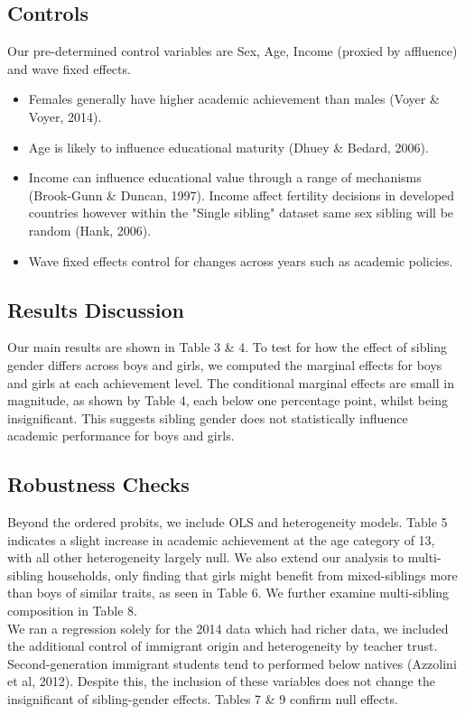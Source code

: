 \documentclass[12pt]{article}
\begin{document}
\subsection{Controls}
Our pre-determined control variables are Sex, Age, Income (proxied by affluence) and wave fixed effects. 
\begin{itemize}
    \item Females generally have higher academic achievement than males (Voyer \& Voyer, 2014). 
    \item Age is likely to influence educational maturity (Dhuey \& Bedard, 2006). 
    \item Income can influence educational value through a range of mechanisms (Brook-Gunn \& Duncan, 1997). Income affect fertility decisions in developed countries however within the "Single sibling" dataset same sex sibling will be random (Hank, 2006).
    \item Wave fixed effects control for changes across years such as academic policies.
\end{itemize}


\subsection{Results Discussion}

Our main results are shown in Table 3 \& 4. To test for how the effect of sibling gender differs across boys and girls, we computed the marginal effects for boys and girls at each achievement level. The conditional marginal effects are small in magnitude, as shown by Table 4, each below one percentage point, whilst being insignificant. This suggests sibling gender does not statistically influence academic performance for boys and girls.

\subsection{Robustness Checks}

Beyond the ordered probits, we include OLS and heterogeneity models. Table 5 indicates a slight increase in academic achievement at the age category of 13, with all other heterogeneity largely null. We also extend our analysis to multi-sibling households, only finding that girls might benefit from mixed-siblings more than boys of similar traits, as seen in Table 6. We further examine multi-sibling composition in Table 8. \\

We ran a regression solely for the 2014 data which had richer data, we included the additional control of immigrant origin and heterogeneity by teacher trust. Second-generation immigrant students tend to performed below natives (Azzolini et al, 2012). Despite this, the inclusion of these variables does not change the insignificant of sibling-gender effects. Tables 7 \& 9 confirm null effects.\\
\end{document}
